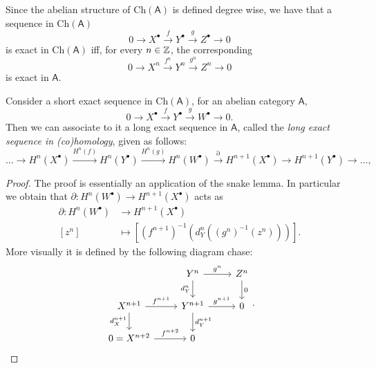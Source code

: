 \begin{rem}
	Since the abelian structure of $\mathrm{Ch}(\mathsf{A})$ is defined degree wise, we have
	that a sequence in $\mathrm{Ch}(\mathsf{A})$
	\begin{equation}
	0 \to X^\bullet \xrightarrow{f} Y^\bullet \xrightarrow{g} 
	Z^\bullet \to 0
	\end{equation} 
	is exact in $\mathrm{Ch}(\mathsf{A})$ iff, for every $n \in \mathbb{Z}$, the corresponding
	\begin{equation}
	0 \to X^n \xrightarrow{f^n} Y^n \xrightarrow{g^n}
	Z^n \to 0
	\end{equation} 
	is exact in $\mathsf{A}$.
\end{rem}

\begin{thm}
	Consider a short exact sequence in $\mathrm{Ch}(\mathsf{A})$, for an abelian category $\mathsf{A}$,
	\begin{equation}
	0 \to X^\bullet \xrightarrow{f} Y^\bullet \xrightarrow{g} W^\bullet \to 0
	.\end{equation} 
	Then we can associate to it a long exact sequence in $\mathsf{A}$, called the
	{\em long exact sequence in (co)homology}, given as follows:
	\begin{equation}
		\ldots \to H^n(X^\bullet) \xrightarrow{H^n(f)} H^n(Y^\bullet) \xrightarrow{H^n(g)} 
		H^n (W^\bullet) \xrightarrow{\partial} H^{n+1}(X^\bullet) \to
		H^{n+1}(Y^\bullet) \to \ldots
	,\end{equation} 
\end{thm}
\begin{proof}
	The proof is essentially an application of the snake lemma.
	In particular we obtain that $\partial\colon H^n(W^\bullet) \to H^{n+1}(X^\bullet)$ acts as
	\begin{align}
		\partial\colon H^n(W^\bullet) &\to H^{n+1}(X^\bullet) \\
		[z^n] &\mapsto \left[ (f^{n+1})^{-1} \left( d_Y^n ((g^n)^{-1}(z^n)) \right) \right]
	.\end{align} 
	More visually it is defined by the following diagram chase:
	\begin{equation}
	\begin{tikzcd}
		&
		Y^n \arrow[r, "g^n", rightarrow] \arrow[d, "d_Y^n"', rightarrow] &
		Z^n \arrow[d, "0", rightarrow] \\
		X^{n+1} \arrow[r, "f^{n+1}", rightarrow] \arrow[d, "d_X^{n+1}"', rightarrow] &
		Y^{n+1} \arrow[r, "g^{n+1}", rightarrow] \arrow[d, "d_Y^{n+1}", rightarrow] &
		0 \\
		0 = X^{n+2} \arrow[r, "f^{n+2}", rightarrow] &
		0
	\end{tikzcd}
	.\end{equation} 
\end{proof}

